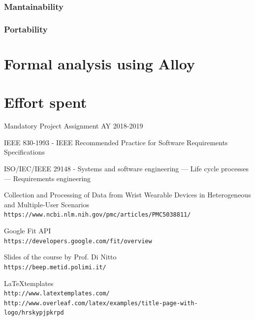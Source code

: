 \documentclass[12pt]{article}
\begin{document}
    \subsubsection{Mantainability}
    \subsubsection{Portability}

\clearpage
\section{Formal analysis using Alloy}
\label{sec:alloy}

\clearpage
\section{Effort spent}
\label{sec:effort}

\clearpage
\begin{thebibliography}{9}
   Mandatory Project Assignment AY 2018-2019

   IEEE 830-1993 - IEEE Recommended Practice for Software Requirements Specifications

   ISO/IEC/IEEE 29148 - Systems and software engineering — Life cycle processes — Requirements engineering

   Collection and Processing of Data from Wrist Wearable Devices in Heterogeneous and Multiple-User Scenarios \\
  \texttt{https://www.ncbi.nlm.nih.gov/pmc/articles/PMC5038811/}

   Google Fit API\\
  \texttt{https://developers.google.com/fit/overview}

  Slides of the course by Prof. Di Nitto
  \\\texttt{https://beep.metid.polimi.it/}

  \LaTeX templates
  \\\texttt{http://www.latextemplates.com/}
  \\\texttt
  {http://www.overleaf.com/latex/examples/title-page-with-logo/hrskypjpkrpd}


\end{thebibliography}
\end{document}
